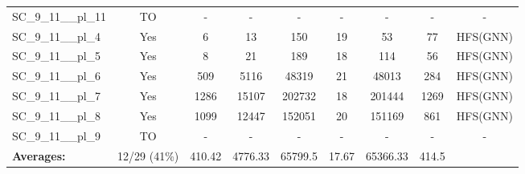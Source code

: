 \documentclass{article}
\begin{document}
\begin{tabular}{lcccccccc}
SC\_9\_11\_\_pl\_11 & TO & - & - & - & - & - & - & - \\
SC\_9\_11\_\_pl\_4 & Yes & 6 & 13 & 150 & 19 & 53 & 77 & HFS(GNN) \\
SC\_9\_11\_\_pl\_5 & Yes & 8 & 21 & 189 & 18 & 114 & 56 & HFS(GNN) \\
SC\_9\_11\_\_pl\_6 & Yes & 509 & 5116 & 48319 & 21 & 48013 & 284 & HFS(GNN) \\
SC\_9\_11\_\_pl\_7 & Yes & 1286 & 15107 & 202732 & 18 & 201444 & 1269 & HFS(GNN) \\
SC\_9\_11\_\_pl\_8 & Yes & 1099 & 12447 & 152051 & 20 & 151169 & 861 & HFS(GNN) \\
SC\_9\_11\_\_pl\_9 & TO & - & - & - & - & - & - & - \\
\textbf{Averages:} & 12/29 (41\%) & 410.42 & 4776.33 & 65799.5 & 17.67 & 65366.33 & 414.5 & \\
\bottomrule
\end{tabular}
\\[0.7cm]
\end{document}
